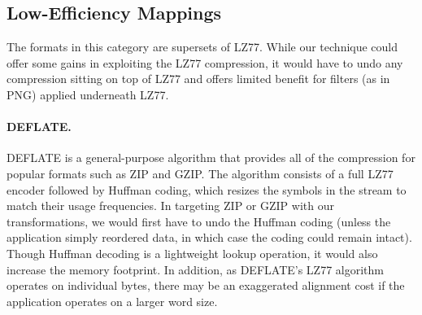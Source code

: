 
\subsection{Low-Efficiency Mappings}
\label{sec:formats-bad}

The formats in this category are supersets of LZ77.  While our
technique could offer some gains in exploiting the LZ77 compression,
it would have to undo any compression sitting on top of LZ77 and
offers limited benefit for filters (as in PNG) applied underneath
LZ77.

\paragraph{DEFLATE.}
DEFLATE is a general-purpose algorithm that provides all of the
compression for popular formats such as ZIP and GZIP.  The algorithm
consists of a full LZ77 encoder followed by Huffman coding, which
resizes the symbols in the stream to match their usage frequencies.
In targeting ZIP or GZIP with our transformations, we would first
have to undo the Huffman coding (unless the application simply
reordered data, in which case the coding could remain intact).  Though
Huffman decoding is a lightweight lookup operation, it would also
increase the memory footprint.  In addition, as DEFLATE's LZ77
algorithm operates on individual bytes, there may be an exaggerated
alignment cost if the application operates on a larger word size.


